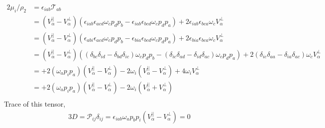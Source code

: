 \begin{align*}
    2 \mu_i / \rho_2
    &= \epsilon_{iab} \mathcal{T}_{ab}\\
    &= (V_\alpha^{||} - V_\alpha^\bot) \left(
        \epsilon_{iab}\epsilon_{acd} \omega_c p_dp_b 
        -  \epsilon_{iab}\epsilon_{bcd} \omega_c p_dp_a
        \right)
    + 2\epsilon_{iab}\epsilon_{bca} \omega_c V_\alpha^\bot\\
    &= (V_\alpha^{||} - V_\alpha^\bot) \left(
        \epsilon_{abi}\epsilon_{acd} \omega_c p_dp_b 
        -  \epsilon_{bia}\epsilon_{bcd} \omega_c p_dp_a
        \right)
    + 2\epsilon_{bia}\epsilon_{bca} \omega_c V_\alpha^\bot\\
    &= (V_\alpha^{||} - V_\alpha^\bot) \left(
        (\delta_{bc}\delta_{id} - \delta_{bd}\delta_{ic}) \omega_c p_dp_b 
        -  
        (\delta_{ic}\delta_{ad} - \delta_{id}\delta_{ac})\omega_c p_dp_a
        \right)
    + 2
    (\delta_{ic}\delta_{aa} - \delta_{ia}\delta_{ac}) \omega_c V_\alpha^\bot\\
    &= 
    + 2(\omega_a p_ip_a) (V_\alpha^{||} - V_\alpha^\bot)
    - 2\omega_i (V_\alpha^{||} - V_\alpha^\bot)
    + 4\omega_i V_\alpha^\bot\\
    &= 
    + 2(\omega_a p_ip_a) (V_\alpha^{||} - V_\alpha^\bot)
    - 2\omega_i (V_\alpha^{||} + V_\alpha^\bot)\\
\end{align*}
Trace of this tensor,
\begin{align*}
    3 D
    = \mathcal{P}_{ij}\delta_{ij} 
    =  \epsilon_{iab} \omega_a 
    p_bp_i (V_\alpha^{||} - V_\alpha^\bot) 
    = 0 
\end{align*}

